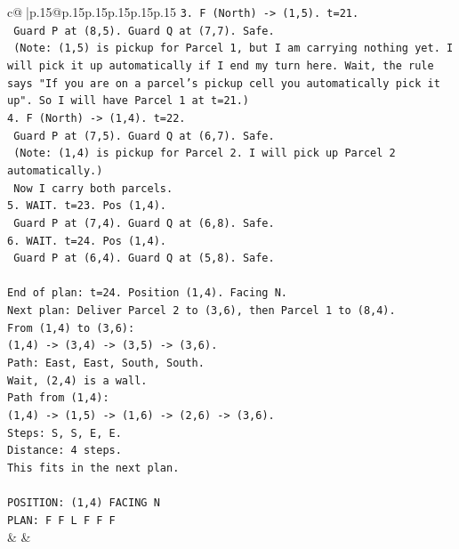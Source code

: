 \documentclass{article}
\begin{document}
{\begin{supertabular}{c@{$\;$}|p{.15\linewidth}@{}p{.15\linewidth}p{.15\linewidth}p{.15\linewidth}p{.15\linewidth}p{.15\linewidth}}
{{{\texttt{3. F (North) {-}> (1,5). t=21.} \\
\texttt{   Guard P at (8,5). Guard Q at (7,7). Safe.} \\
\texttt{   (Note: (1,5) is pickup for Parcel 1, but I am carrying nothing yet. I will pick it up automatically if I end my turn here. Wait, the rule says "If you are on a parcel's pickup cell you automatically pick it up". So I will have Parcel 1 at t=21.)} \\
\texttt{4. F (North) {-}> (1,4). t=22.} \\
\texttt{   Guard P at (7,5). Guard Q at (6,7). Safe.} \\
\texttt{   (Note: (1,4) is pickup for Parcel 2. I will pick up Parcel 2 automatically.)} \\
\texttt{   Now I carry both parcels.} \\
\texttt{5. WAIT. t=23. Pos (1,4).} \\
\texttt{   Guard P at (7,4). Guard Q at (6,8). Safe.} \\
\texttt{6. WAIT. t=24. Pos (1,4).} \\
\texttt{   Guard P at (6,4). Guard Q at (5,8). Safe.} \\
\\ 
\texttt{End of plan: t=24. Position (1,4). Facing N.} \\
\texttt{Next plan: Deliver Parcel 2 to (3,6), then Parcel 1 to (8,4).} \\
\texttt{From (1,4) to (3,6):} \\
\texttt{(1,4) {-}> (3,4) {-}> (3,5) {-}> (3,6).} \\
\texttt{Path: East, East, South, South.} \\
\texttt{Wait, (2,4) is a wall.} \\
\texttt{Path from (1,4):} \\
\texttt{(1,4) {-}> (1,5) {-}> (1,6) {-}> (2,6) {-}> (3,6).} \\
\texttt{Steps: S, S, E, E.} \\
\texttt{Distance: 4 steps.} \\
\texttt{This fits in the next plan.} \\
\\ 
\texttt{POSITION: (1,4) FACING N} \\
\texttt{PLAN: F F L F F F} \\
            }
        }
    }
    & & \\ \\


\end{supertabular}}
\end{document}
